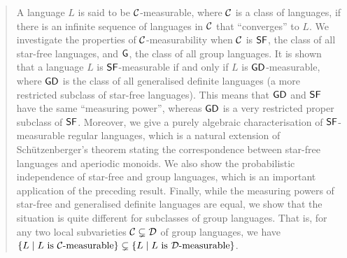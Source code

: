 \begin{abstract}
A language \(L\) is said to be \(\CC\)-measurable, where \(\CC\) is a
class of languages, if there is an infinite sequence of languages in
\(\CC\) that ``converges'' to \(L\).
We investigate the properties of \(\CC\)-measurability when \(\CC\) is \(\sf\), the class of all star-free languages, and \(\group\), the class of all group languages.
It is shown that a language \(L\) is \(\sf\)-measurable if and only if \(L\) is \(\gd\)-measurable, where \(\gd\) is the class of all generalised definite languages (a more restricted subclass of star-free languages).
This means that \(\gd\) and \(\sf\) have the same ``measuring power'', whereas \(\gd\) is a very restricted proper subclass of \(\sf\).
Moreover, we give a purely algebraic characterisation of \(\sf\)-measurable regular languages, which is a natural extension of Sch\"utzenberger's theorem stating the correspondence between star-free languages and aperiodic monoids.
We also show the probabilistic independence of star-free and group languages, which is an important application of the preceding result.
Finally, while the measuring powers of star-free and generalised definite languages are equal, we show that the situation is quite different for subclasses of group languages.
That is, for any two local subvarieties \(\CC \subsetneq \CD\) of group languages, we have \(\{ L \mid L \text{ is } \CC\text{-measurable}\}
\subsetneq \{ L \mid L \text{ is } \CD\text{-measurable}\}\).
\end{abstract}

